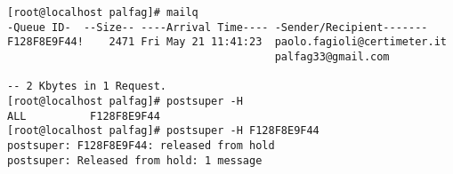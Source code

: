   \begin{verbatim}
[root@localhost palfag]# mailq
-Queue ID-  --Size-- ----Arrival Time---- -Sender/Recipient-------
F128F8E9F44!    2471 Fri May 21 11:41:23  paolo.fagioli@certimeter.it
                                          palfag33@gmail.com

-- 2 Kbytes in 1 Request.
[root@localhost palfag]# postsuper -H 
ALL          F128F8E9F44  
[root@localhost palfag]# postsuper -H F128F8E9F44 
postsuper: F128F8E9F44: released from hold
postsuper: Released from hold: 1 message
  \end{verbatim}